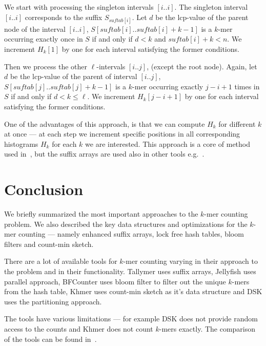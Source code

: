 We start with processing the singleton intervals $[i..i]$. The singleton interval $[i..i]$ corresponds to the suffix $S_{suftab[i]}$. Let $d$ be the lcp-value of the parent node of the interval $[i..i]$, $S[suftab[i]..suftab[i]+k-1]$ is a $k$-mer occurring exactly once in $S$ if and only if $d < k$ and $suftab[i]+k < n$. We increment $H_k[1]$ by one for each interval satisfying the former conditions.

Then we process the other $\ell$-intervals $[i..j]$, (except the root node). Again, let $d$ be the lcp-value of the parent of interval $[i..j]$, $S[suftab[j]..suftab[j] + k - 1]$ is a $k$-mer occurring exactly $j - i + 1$ times in $S$ if and only if $d < k \leq \ell$. We increment $H_k[j-i+1]$ by one for each interval satisfying the former conditions.

One of the advantages of this approach, is that we can compute $H_k$ for different $k$ at once --- at each step we increment specific positions in all corresponding histograms $H_k$ for each $k$ we are interested. This approach is a core of method used in~\cite{tallymer}, but the suffix arrays are used also in other tools e.g.~\cite{jellyfish}.


\section{Conclusion}

We briefly summarized the most important approaches to the $k$-mer counting problem. We also described the key data structures and optimizations for the $k$-mer counting --- namely enhanced suffix arrays, lock free hash tables, bloom filters and count-min sketch.

There are a lot of available tools for $k$-mer counting varying in their approach to the problem and in their functionality. Tallymer uses suffix arrays, Jellyfish uses parallel approach, BFCounter uses bloom filter to filter out the unique $k$-mers from the hash table, Khmer uses count-min sketch as it's data structure and DSK uses the partitioning approach.

The tools have various limitations --- for example DSK does not provide random access to the counts and Khmer does not count $k$-mers exactly.
The comparison of the tools can be found in~\cite{khmer}.
